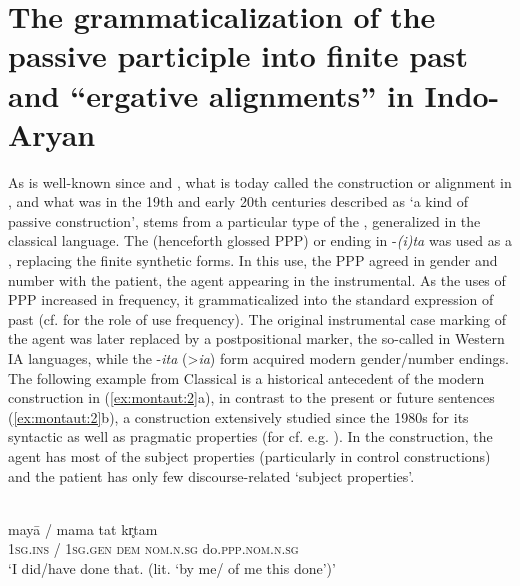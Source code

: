 \documentclass[output=paper]{langsci/langscibook}
\begin{document}
\section{The grammaticalization of the passive participle into finite past and “ergative alignments” in Indo-Aryan}\label{sec:montaut:2}

As is well-known since \citet{Kellogg1875} and \citet{Grierson1903-1928}, what is today called the  construction or alignment in , and what was in the 19th and early 20th centuries described as ‘a kind of passive construction’, stems from a particular type of the  , generalized in the classical language\footnotemark{}. The  (henceforth glossed PPP) or  ending in -\textit{(i)ta} was used as a , replacing the finite  synthetic  forms. In this  use, the PPP agreed in gender and number with the patient, the agent appearing in the instrumental. As the  uses of PPP increased in frequency, it grammaticalized into the standard expression of past (cf. \citealt{Bybee2003} for the role of use frequency). The original instrumental case marking of the agent was later replaced by a postpositional marker, the so-called   in Western IA languages, while the -\textit{ita} (>\textit{ia}) form acquired modern gender/number endings. 
The following example from Classical   is a historical antecedent of the modern  construction in  (\ref{ex:montaut:2}a), in contrast to the present or future  sentences (\ref{ex:montaut:2}b), a construction extensively studied since the 1980s for its syntactic as well as pragmatic properties (for  cf. e.g. \citealt{Kachru1987,Montaut2004,Davison2002}). In the  construction, the agent has most of the subject properties (particularly in control constructions) and the patient has only few discourse-related ‘subject properties’.

\ea
\label{ex:montaut:1}
\\
\gll mayā     /  mama       tat              kr̥tam\\
\textsc{1sg.ins} /   \textsc{1sg.gen}     \textsc{dem nom.n.sg}   do.\textsc{ppp.nom.n.sg} \\ 
\glt ‘I did/have done that. (lit. ‘by me/ of me this done’)’\footnotemark{} 
\z 
\end{document}
